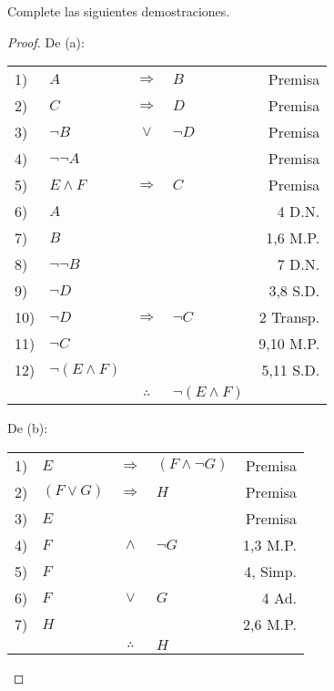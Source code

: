 \documentclass[12pt]{report}
\theoremstyle{largebreak}
\begin{document}
    \begin{excer}
        Complete las siguientes demostraciones.
    \end{excer}

    \begin{proof}
        De (a):
        \begin{center}
            \begin{tabular}{l l c l r}
                1) & $A$ & $\Rightarrow$ & $B$ & Premisa \\
                2) & $C$ & $\Rightarrow$ & $D$ & Premisa \\
                3) & $\neg B$ & $\lor$ & $\neg D$ & Premisa \\
                4) & $\neg\neg A$ &  &  & Premisa \\
                5) & $E\land F$ & $\Rightarrow$ & $C$ & Premisa \\
                6) & $A$ &  &  & 4 D.N. \\
                7) & $B$ &  &  & 1,6 M.P. \\
                8) & $\neg\neg B$ &  &  & 7 D.N. \\
                9) & $\neg D$ &  &  & 3,8 S.D.\\
                10) & $\neg D$ & $\Rightarrow$ & $\neg C$ & 2 Transp. \\
                11) & $\neg C$ &  &  & 9,10 M.P.\\
                12) & $\neg(E\land F)$ &  &  & 5,11 S.D.\\
                \hline
                & & $\therefore$ & $\neg (E\land F)$ & \\
            \end{tabular}
        \end{center}

        De (b):
        \begin{center}
            \begin{tabular}{l l c l r}
                1) & $E$ & $\Rightarrow$ & $(F\land\neg G)$ & Premisa \\
                2) & $(F\lor G)$ & $\Rightarrow$ & $H$ & Premisa \\
                3) & $E$ &  &  & Premisa \\
                4) & $F$ & $\land$ & $\neg G$ & 1,3 M.P. \\
                5) & $F$ &  &  & 4, Simp. \\
                6) & $F$ & $\lor$ & $G$ & 4 Ad. \\
                7) & $H$ &  &  & 2,6 M.P. \\
                \hline
                & & $\therefore$ & $H$ & \\
            \end{tabular}
        \end{center}
    \end{proof}
\end{document}
